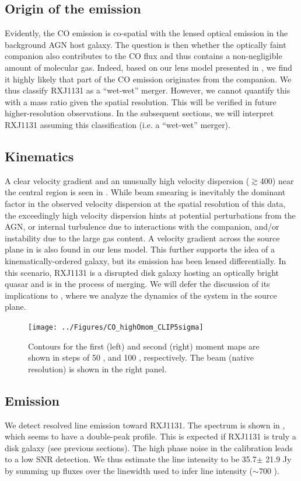 \documentclass[]{emulateapj}
\begin{document}
\subsection{Origin of the \bco emission} \label{sec:origin} %
Evidently, the CO emission is co-spatial with the lensed optical emission in
the background AGN host galaxy. The question is then whether the optically
faint companion also contributes to the CO flux and thus contains a
non-negligible amount of molecular gas.
Indeed, based on our lens model presented in , we find it
highly likely that part of the CO emission originates from
the companion. We thus classify RXJ1131 as a ``wet-wet'' merger.
However, we cannot quantify this with a mass ratio given the
spatial resolution. This will be verified in future higher-resolution observations.
In the subsequent sections, we will interpret RXJ1131
assuming this classification (i.e. a ``wet-wet'' merger).

\subsection{\bco Kinematics} %
A clear velocity gradient and an unusually high
velocity dispersion ($\gtrsim$400\kms) near the central region
is seen in . While beam smearing is inevitably the
dominant factor in the observed velocity dispersion
at the spatial resolution of this data, the exceedingly
high velocity dispersion hints
at potential perturbations from the AGN, or internal turbulence due to
interactions with the companion, and/or instability due to the large gas
content. A velocity gradient across the source plane in  is also
found in our lens model. This further supports the idea of a
kinematically-ordered galaxy, but its emission has been lensed differentially.
In this scenario, RXJ1131 is a disrupted disk galaxy hosting an optically
bright quasar and is in the process of merging.
We will defer the discussion of its implications to ,
where we analyze the dynamics of the system in the source plane.

\begin{figure}[!htbp]
\centering
\texttt{[image: ../Figures/CO\_highOmom\_CLIP5sigma]}
\caption{
Contours for the first (left) and second (right) moment maps are shown in steps of
50 \kms, and 100 \kms, respectively. The beam (native resolution) is shown in the right panel.
\label{fig:CO21highO}}
\end{figure}


\subsection{\cco Emission} %
We detect resolved \cco line emission toward RXJ1131. The spectrum is shown in
, which seems to have a double-peak profile.
This is expected if RXJ1131 is truly a disk galaxy (see previous
sections). The high phase noise in the calibration leads to a low SNR
detection. We thus estimate the line intensity to be
35.7$\pm$ 21.9 Jy\,\kms by summing up fluxes over the
linewidth used to infer \bco line intensity ($\sim$700 \kms).
\end{document}
